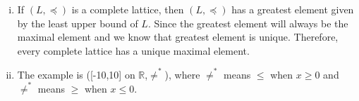 \documentclass{article}[12pt]
\begin{document}
\begin{enumerate}[(i)]
\item 
If $(L,\preceq)$ is a complete lattice, then $(L,\preceq)$ has a greatest element given by the least upper bound of $L$. Since the greatest element will always be the maximal element and we know that greatest element is unique. Therefore, every complete lattice has a unique maximal element.
\item 
The example is ([-10,10] on $\mathbb{R}$,$ \not=^* $), where $\not=^*$ means $\leq$ when $x\geq 0$ and $\not=^*$ means $\geq$ when $x\leq 0$.


\end{enumerate}
\end{document}
